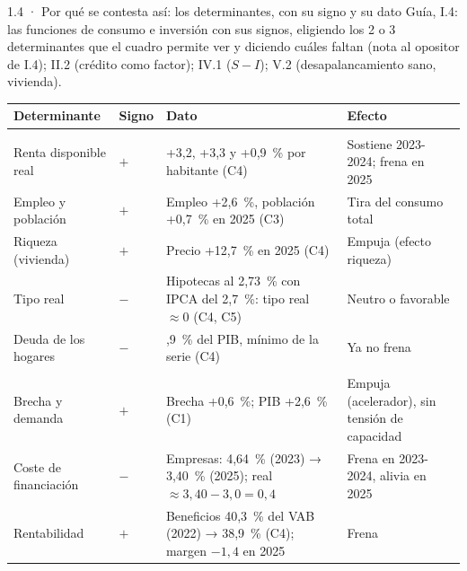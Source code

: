 \begin{complemento}{1.4 · Por qué se contesta así: los determinantes, con su signo y su dato}
 Guía, I.4: las funciones de consumo e inversión con sus signos, eligiendo los 2 o 3 determinantes que el cuadro permite ver y diciendo cuáles faltan (nota al opositor de I.4); II.2 (crédito como factor); IV.1 ($S-I$); V.2 (desapalancamiento sano, vivienda).

\begin{tablacaja}
\centering\scriptsize
\caption{Los determinantes del consumo y la inversión en el cuadernillo (2023-2025)}\label{tab:determinantes}
\begin{tabular}{>{\raggedright\arraybackslash}p{3.1cm}>{\centering\arraybackslash}p{0.9cm}>{\raggedright\arraybackslash}p{6.0cm}>{\raggedright\arraybackslash}p{3.6cm}}
\toprule
\rowcolor{tceeazulpalido}
\textbf{Determinante} & \textbf{Signo} & \textbf{Dato} & \textbf{Efecto} \\
\midrule
\rowcolor{tceesalvia}\multicolumn{4}{l}{\emph{Consumo}: $C=f(Y^d_{\text{real}}{}^{+},\ \text{riqueza}^{+},\ r^{-},\ \pi^{-},\ \text{crédito}^{+},\ \text{deuda}^{-},\ N^{+},\ \text{incertidumbre}^{-})$} \\
Renta disponible real & $+$ & +3,2, +3,3 y +0,9~\% por habitante (C4) & Sostiene 2023-2024; frena en 2025 \\
Empleo y población & $+$ & Empleo +2,6~\%, población +0,7~\% en 2025 (C3) & Tira del consumo total \\
Riqueza (vivienda) & $+$ & Precio +12,7~\% en 2025 (C4) & Empuja (efecto riqueza) \\
Tipo real & $-$ & Hipotecas al 2,73~\% con IPCA del 2,7~\%: tipo real $\approx0$ (C4, C5) & Neutro o favorable \\
Deuda de los hogares & $-$ & 42,9~\% del PIB, mínimo de la serie (C4) & Ya no frena \\
\rowcolor{tceesalvia}\multicolumn{4}{l}{\emph{Inversión}: $I=f(r^{lp\,-},\ \gamma^e_Y{}^{+},\ \mathrm{OG}^{+},\ \mathrm{EBE}^{+},\ \text{crédito}^{+},\ \text{incertidumbre}^{-})$} \\
Brecha y demanda & $+$ & Brecha +0,6~\%; PIB +2,6~\% (C1) & Empuja (acelerador), sin tensión de capacidad \\
Coste de financiación & $-$ & Empresas: 4,64~\% (2023) → 3,40~\% (2025); real $\approx3{,}40-3{,}0=0{,}4$ & Frena en 2023-2024, alivia en 2025 \\
Rentabilidad & $+$ & Beneficios 40,3~\% del VAB (2022) → 38,9~\% (C4); margen $-1{,}4$ en 2025 & Frena \\

\end{tabular}
\end{tablacaja}
\end{complemento}
